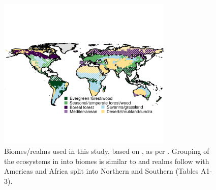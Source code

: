 \documentclass[bg, manuscript]{copernicus}
\begin{document}


\appendixfigures  %
\begin{figure}[t]
\includegraphics[width=8.3cm]{figs/biomeMap.png}
\caption{Biomes/realms used in this study, based on \citet{Olson2001-gv}, as per \citet{Sellar2019-bo}. Grouping of the ecosystems in\citet{Olson2001-gv} into biomes is similar to \citet{Kelley2019-yu} and realms follow \citet{Olson2001-gv} with Americas and Africa split into Northern and Southern (Tables A1-3).
 \label{fig:regionsMap}}
\end{figure}
\end{document}
